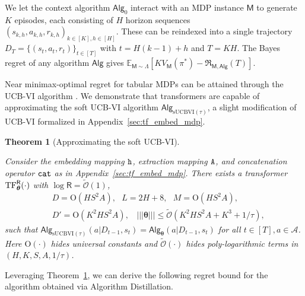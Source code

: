 \documentclass[10pt]{article}
\newtheorem{theorem}{Theorem}
\newcommand{\<}{\left\langle}
\renewcommand{\>}{\right\rangle}
\newcommand{\TF}{{\rm TF}}
\newcommand{\nrmp}[1]{{\left|\!\left|\!\left|{#1}\right|\!\right|\!\right|}}
\newcommand{\E}{\mathbb{E}}
\newcommand{\inst}{{\mathsf{M}}}
\newcommand{\temp}{{\tau}}
\newcommand{\tcO}{{\tilde{\mathcal O}}}
\newcommand{\state}{{s}}
\newcommand{\action}{{a}}
\newcommand{\reward}{{r}}
\newcommand{\totlen}{{T}}
\newcommand{\cat}{{\tt cat}}
\newcommand{\extractmap}{{\tt A}}
\newcommand{\embedmap}{{\tt h}}
\newcommand{\sAlg}{{\mathsf{Alg}}}
\newcommand{\dset}{{D}}
\newcommand{\plc}{{\pi}}
\newcommand{\prior}{{\Lambda}}
\newcommand{\Numepi}{{K}}
\newcommand{\horizon}{{H}}
\newcommand{\actionsp}{{\mathcal{A}}}
\renewcommand{\horizon}{{H}}
\newcommand{\valuefun}{{V}}
\newcommand{\tfpar}{{\btheta}}
\newcommand{\hidden}{{D'}}
\newcommand{\clipval}{{\mathsf{R}}}
\newcommand{\totreward}{{\mathfrak{R}}}
\newcommand{\Numst}{{S}}
\newcommand{\Numact}{{A}}
\newcommand{\Vfun}{{\valuefun}}
\newcommand{\sUCBVI}{{\mathrm{sUCBVI}}}
\newcommand{\conO}{{\mathrm{O}}}
\def\btheta{{\boldsymbol \theta}}
\begin{document}
We let the context algorithm $\sAlg_0$ interact with an MDP instance $\inst$ to generate $\Numepi$ episodes, each consisting of $\horizon$ horizon sequences $ (\state_{k,h},\action_{k,h},\reward_{k,h})_{k \in [\Numepi], h \in [\horizon]}$. These can be reindexed into a single trajectory $\dset_{\totlen} = \{ (\state_t,\action_t,\reward_t) \}_{t \in [\totlen]}$ with $t=H(k-1)+h$ and $\totlen=\Numepi\horizon$. The Bayes regret of any algorithm $\sAlg$ gives $\E_{\inst\sim\prior}[\Numepi\Vfun_\inst(\plc^*)-\totreward_{\inst,\sAlg}(\totlen)]$.




Near minimax-optimal regret for tabular MDPs can be attained through the UCB-VI algorithm \citep{azar2017minimax}. We demonstrate that transformers are capable of approximating the soft UCB-VI algorithm $\sAlg_{\sUCBVI(\tau)}$, a slight modification of UCB-VI formalized in Appendix~\ref{sec:tf_embed_mdp}.












\begin{theorem}[Approximating the soft UCB-VI]\label{thm:approx_ucbvi}

Consider the embedding mapping $\embedmap$, extraction mapping $\extractmap$, and concatenation operator $\cat$ as in Appendix~\ref{sec:tf_embed_mdp}. There exists a transformer $\TF_\btheta^{\clipval}(\cdot)$ with $\log \clipval = \tcO(1)$,
\begin{equation}\label{eq:ucbvi_tf_param-main}
\begin{aligned}
&~D =\conO(\horizon\Numst^2\Numact),~~~L= 2\horizon+8,~~~M= \conO(\horizon\Numst^2\Numact),\\
&~\hidden= \conO(\Numepi^2\horizon\Numst^2\Numact),~~~~\nrmp{\btheta}\leq \tcO(\Numepi^2\horizon\Numst^2\Numact+\Numepi^3+1/\temp),
\end{aligned}
\end{equation}
such that
$\sAlg_{\sUCBVI(\tau)}(\action|\dset_{t-1},\state_t) = \sAlg_{\tfpar}(\action|\dset_{t-1},\state_t)$ for all $t\in[T],\action\in\actionsp$. Here $\conO(\cdot)$ hides universal constants and $\tcO(\cdot)$  hides poly-logarithmic terms in $(\horizon,\Numepi,\Numst,\Numact,1/\temp)$.
\end{theorem}

Leveraging Theorem~\ref{thm:approx_ucbvi}, we can derive the following regret bound for the algorithm obtained via Algorithm Distillation.
\end{document}
